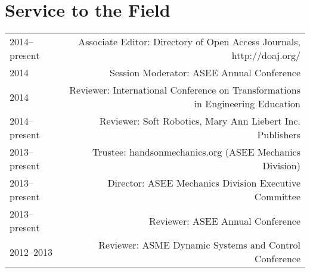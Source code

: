 \section*{Service to the Field}
\begin{tabular}{L!{\VRule}R}
2014--present&Associate Editor: Directory of Open Access Journals, http://doaj.org/\\
2014&Session Moderator: ASEE Annual Conference\\
2014&Reviewer: International Conference on Transformations in Engineering Education\\
2014--present&Reviewer: Soft Robotics, Mary Ann Liebert Inc. Publishers\\
2013--present&Trustee: handsonmechanics.org (ASEE Mechanics Division)\\
2013--present&Director: ASEE Mechanics Division Executive Committee\\
2013--present&Reviewer: ASEE Annual Conference\\
2012--2013&Reviewer: ASME Dynamic Systems and Control Conference\\
\end{tabular}